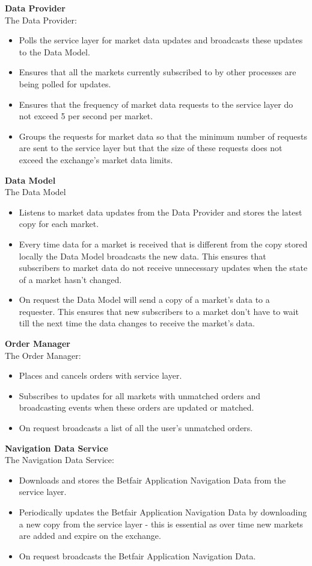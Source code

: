 	\textbf{Data Provider}\\	
	The Data Provider:
		\begin{itemize}
			\item Polls the service layer for market data updates and broadcasts these updates to the Data Model.
			\item Ensures that all the markets currently subscribed to by other processes are being polled for updates.
			\item Ensures that the frequency of market data requests to the service layer do not exceed 5 per second per market.
			\item Groups the requests for market data so that the minimum number of requests are sent to the service layer but that the size of these requests does not exceed the exchange's market data limits\cite{dataRequestLimits}.
		\end{itemize}			
		
	\textbf{Data Model}\\
	\label{section:dataModel}
	The Data Model 
		\begin{itemize}
			\item Listens to market data updates from the Data Provider and stores the latest copy for each market.
			\item Every time data for a market is received that is different from the copy stored locally the Data Model broadcasts the new data. This ensures that subscribers to market data do not receive unnecessary updates when the state of a market hasn't changed.
			\item On request the Data Model will send a copy of a market's data to a requester. This ensures that new subscribers to a market don't have to wait till the next time the data changes to receive the market's data.
		\end{itemize}			
	
	\textbf{Order Manager}\\
	The Order Manager:
		\begin{itemize}
			\item Places and cancels orders with service layer.
			\item Subscribes to updates for all markets with unmatched orders and broadcasting events when these orders are updated or matched.
			\item On request broadcasts a list of all the user's unmatched orders. 
		\end{itemize}
	
	\textbf{Navigation Data Service}\\
	The Navigation Data Service:
		\begin{itemize}
			\item Downloads and stores the Betfair Application Navigation Data from the service layer.
			\item Periodically updates the Betfair Application Navigation Data by downloading a new copy from the service layer - this is essential as over time new markets are added and expire on the exchange.
			\item On request broadcasts the Betfair Application Navigation Data.
		\end{itemize}
		
